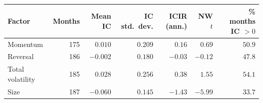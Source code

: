 \begin{tabular}{lrrrrrr}
\toprule
Factor & Months & Mean IC & IC std.\ dev. & ICIR (ann.) & NW $t$ & \% months IC $>0$ \\
\midrule
Momentum & 175 & $0.010$ & $0.209$ & $0.16$ & $0.69$ & $50.9$ \\
Reversal & 186 & $-0.002$ & $0.180$ & $-0.03$ & $-0.12$ & $47.8$ \\
Total volatility & 185 & $0.028$ & $0.256$ & $0.38$ & $1.55$ & $54.1$ \\
Size & 187 & $-0.060$ & $0.145$ & $-1.43$ & $-5.99$ & $33.7$ \\
\bottomrule
\end{tabular}
